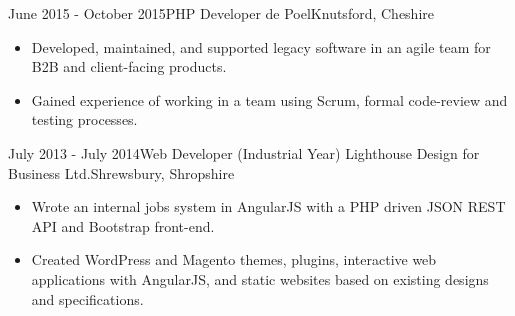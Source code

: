 \documentclass[11pt,a4paper]{moderncv}
\begin{document}
		\cventry
			{June 2015 - October 2015}{PHP Developer}
			{de Poel}{Knutsford, Cheshire}
			{}{
				\begin{itemize}
					\item Developed, maintained, and supported legacy software in an agile team for B2B and client-facing products.
					\item Gained experience of working in a team using Scrum, formal code-review and testing processes.
				\end{itemize}
				\vspace{.25em}
			}
		\cventry
			{July 2013 - July 2014}{Web Developer (Industrial Year)}
			{Lighthouse Design for Business Ltd.}{Shrewsbury, Shropshire}
			{}{
				\begin{itemize}
					\item Wrote an internal jobs system in AngularJS with a PHP driven JSON REST API and Bootstrap front-end.
					\item Created WordPress and Magento themes, plugins, interactive web applications with AngularJS, and static websites based on existing designs and specifications.
				\end{itemize}
			}
\end{document}
